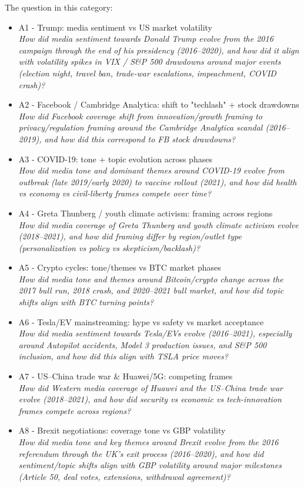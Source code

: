 The question in this category:
\begin{itemize}
    \item A1 - Trump: media sentiment vs US market volatility \\ \textit{How did media sentiment towards Donald Trump evolve from the 2016 campaign through the end of his presidency (2016–2020), and how did it align with volatility spikes in VIX / S\&P 500 drawdowns around major events (election night, travel ban, trade-war escalations, impeachment, COVID crash)?}
    \item A2 - Facebook / Cambridge Analytica: shift to "techlash" + stock drawdowns \\ \textit{How did Facebook coverage shift from innovation/growth framing to privacy/regulation framing around the Cambridge Analytica scandal (2016–2019), and how did this correspond to FB stock drawdowns?}
    \item A3 - COVID-19: tone + topic evolution across phases \\ \textit{How did media tone and dominant themes around COVID-19 evolve from outbreak (late 2019/early 2020) to vaccine rollout (2021), and how did health vs economy vs civil-liberty frames compete over time?}
    \item A4 - Greta Thunberg / youth climate activism: framing across regions \\ \textit{How did media coverage of Greta Thunberg and youth climate activism evolve (2018–2021), and how did framing differ by region/outlet type (personalization vs policy vs skepticism/backlash)?}
    \item A5 - Crypto cycles: tone/themes vs BTC market phases \\ \textit{How did media tone and themes around Bitcoin/crypto change across the 2017 bull run, 2018 crash, and 2020–2021 bull market, and how did topic shifts align with BTC turning points?}
    \item A6 - Tesla/EV mainstreaming: hype vs safety vs market acceptance \\ \textit{How did media sentiment towards Tesla/EVs evolve (2016–2021), especially around Autopilot accidents, Model 3 production issues, and S\&P 500 inclusion, and how did this align with TSLA price moves?}
    \item A7 - US–China trade war \& Huawei/5G: competing frames \\ \textit{How did Western media coverage of Huawei and the US–China trade war evolve (2018–2021), and how did security vs economic vs tech-innovation frames compete across regions?}
    \item A8 - Brexit negotiations: coverage tone vs GBP volatility \\ \textit{How did media tone and key themes around Brexit evolve from the 2016 referendum through the UK's exit process (2016–2020), and how did sentiment/topic shifts align with GBP volatility around major milestones (Article 50, deal votes, extensions, withdrawal agreement)?}
\end{itemize}

